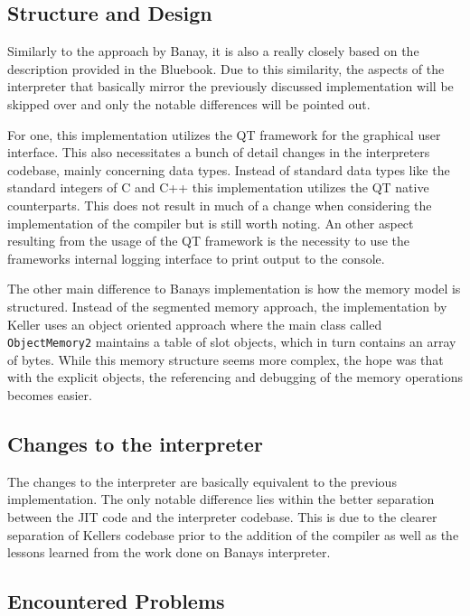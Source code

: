 \subsection{Structure and Design}
Similarly to the approach by Banay, it is also a really closely based on the description provided in the Bluebook. 
Due to this similarity, the aspects of the interpreter that basically mirror the previously discussed implementation will be skipped over and only the notable differences will be pointed out. 

For one, this implementation utilizes the QT framework for the graphical user interface. This also necessitates a bunch of detail changes in the interpreters codebase, mainly concerning data types. Instead of standard data types like the standard integers of C and C++ this implementation utilizes the QT native counterparts. This does not result in much of a change when considering the implementation of the \jit{} compiler but is still worth noting. 
An other aspect resulting from the usage of the QT framework is the necessity to use the frameworks internal logging interface to print output to the console. 

The other main difference to Banays implementation is how the memory model is structured. Instead of the segmented memory approach, the implementation by Keller uses an object oriented approach where the main class called \texttt{ObjectMemory2} maintains a table of slot objects, which in turn contains an array of bytes. While this memory structure seems more complex, the hope was that with the explicit objects, the referencing and debugging of the memory operations becomes easier. 

\subsection{Changes to the interpreter}
The changes to the interpreter are basically equivalent to the previous implementation. The only notable difference lies within the better separation between the JIT code and the interpreter codebase. This is due to the clearer separation of Kellers codebase prior to the addition of the \jit{} compiler as well as the lessons learned from the work done on Banays interpreter. 

\subsection{Encountered Problems}
